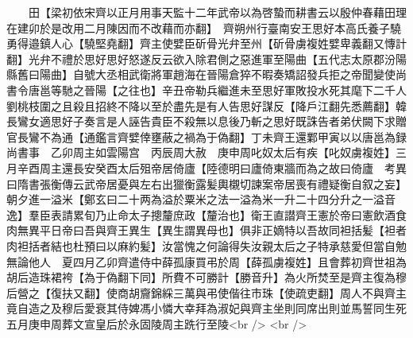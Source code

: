 　　田【梁初依宋齊以正月用事天監十二年武帝以為啓蟄而耕書云以殷仲春藉田理在建卯於是改用二月陳因而不改藉而亦翻】　齊朔州行臺南安王思好本高氏養子驍勇得邉鎮人心【驍堅堯翻】齊主使嬖臣斫骨光弁至州【斫骨虜複姓嬖卑義翻又慱計翻】光弁不禮於思好思好怒遂反云欲入除君側之惡進軍至陽曲【五代志太原郡汾陽縣舊曰陽曲】自號大丞相武衛將軍趙海在晉陽倉猝不暇奏矯詔發兵拒之帝聞變使尚書令唐邕等馳之晉陽【之往也】辛丑帝勒兵繼進未至思好軍敗投水死其麾下二千人劉桃枝圍之且殺且招終不降以至於盡先是有人告思好謀反【降戶江翻先悉薦翻】韓長鸞女適思好子奏言是人誣告貴臣不殺無以息後乃斬之思好既誅告者弟伏闕下求贈官長鸞不為通【通鑑言齊嬖倖壅蔽之禍為于偽翻】丁未齊王還鄴甲寅以以唐邕為録尚書事　乙卯周主如雲陽宫　丙辰周大赦　庚申周叱奴太后有疾【叱奴虜複姓】三月辛酉周主還長安癸酉太后殂帝居倚廬【陸德明曰廬倚東牆而為之故曰倚廬　考異曰隋書張衡傳云武帝居憂與左右出獵衡露髪輿櫬切諫案帝居喪有禮疑衡自叙之妄】朝夕進一溢米【鄭玄曰二十两為溢於粟米之法一溢為米一升二十四分升之一溢音逸】羣臣表請累旬乃止命太子摠釐庶政【釐治也】衛王直譛齊王憲於帝曰憲飲酒食肉無異平日帝曰吾與齊王異生【異生謂異母也】俱非正嫡特以吾故同袒括髪【袒者肉袒括者結也杜預曰以麻約髪】汝當愧之何論得失汝親太后之子特承慈愛但當自勉無論他人　夏四月乙卯齊遣侍中薛孤康買弔於周【薛孤虜複姓】且會葬初齊世祖為胡后造珠裙袴【為于偽翻下同】所費不可勝計【勝音升】為火所焚至是齊主復為穆后營之【復扶又翻】使商胡齎錦綵三萬與弔使偕往市珠【使疏吏翻】周人不與齊主竟自造之及穆后愛衰其侍婢馮小憐大幸拜為淑妃與齊主坐則同席出則並馬誓同生死五月庚申周葬文宣皇后於永固陵周主跣行至陵<br />
<br />
